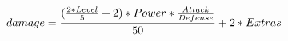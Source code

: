 \documentclass[preview]{standalone}
\begin{document}
\begin{align*}
\special{dvisvgm:raw <g id='unique000'>}damage = \frac{(\frac{2 * Level}{5} + 2) * Power * \frac{Attack}{Defense}}{50} + 2 * Extras\special{dvisvgm:raw </g>}
\end{align*}
\end{document}
